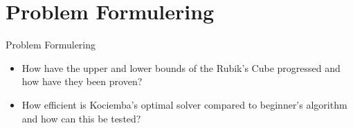 \section{Problem Formulering}
\begin{frame}{Problem Formulering}
\begin{itemize}
	\item<1>How have the upper and lower bounds of the Rubik's Cube progressed and how have they been proven?
	\item<1>How efficient is Kociemba's optimal solver compared to beginner's algorithm and how can this be tested?
\end{itemize}
\end{frame}